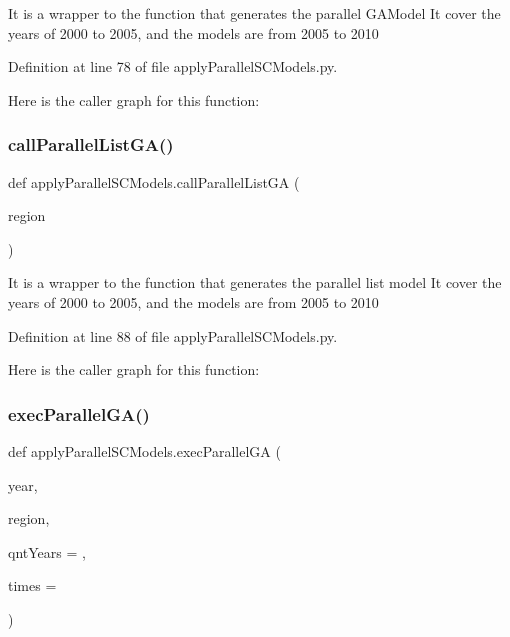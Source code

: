 \begin{DoxyVerb}It is a wrapper to the function that generates the parallel GAModel
It cover the years of 2000 to 2005, and the models are from 2005 to 2010
\end{DoxyVerb}
 

Definition at line 78 of file apply\+Parallel\+S\+C\+Models.\+py.

Here is the caller graph for this function\+:
\mbox{\label{namespaceapply_parallel_s_c_models_afb8acc8d78df198e7e3b9b386f409df3}} 
\subsubsection{\texorpdfstring{call\+Parallel\+List\+G\+A()}{callParallelListGA()}}
{\footnotesize\ttfamily def apply\+Parallel\+S\+C\+Models.\+call\+Parallel\+List\+GA (\begin{DoxyParamCaption}\item[{}]{region }\end{DoxyParamCaption})}

\begin{DoxyVerb}It is a wrapper to the function that generates the parallel  list model
It cover the years of 2000 to 2005, and the models are from 2005 to 2010
\end{DoxyVerb}
 

Definition at line 88 of file apply\+Parallel\+S\+C\+Models.\+py.

Here is the caller graph for this function\+:
\mbox{\label{namespaceapply_parallel_s_c_models_aac9a059787ef56095eeb73cbdfc76293}} 
\subsubsection{\texorpdfstring{exec\+Parallel\+G\+A()}{execParallelGA()}}
{\footnotesize\ttfamily def apply\+Parallel\+S\+C\+Models.\+exec\+Parallel\+GA (\begin{DoxyParamCaption}\item[{}]{year,  }\item[{}]{region,  }\item[{}]{qnt\+Years = {},  }\item[{}]{times = {} }\end{DoxyParamCaption})}

